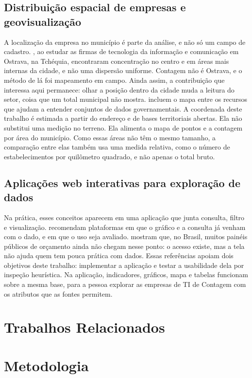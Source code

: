 \subsection{Distribuição espacial de empresas e geovisualização}

A localização da empresa no município é parte da análise, e não só um campo de cadastro.
, ao estudar as firmas de tecnologia da informação e comunicação em Ostrava, na Tchéquia, encontraram concentração no centro e em áreas mais internas da cidade, e não uma dispersão uniforme.
Contagem não é Ostrava, e o método de lá foi mapeamento em campo.
Ainda assim, a contribuição que interessa aqui permanece: olhar a posição dentro da cidade muda a leitura do setor, coisa que um total municipal não mostra.
 incluem o mapa entre os recursos que ajudam a entender conjuntos de dados governamentais.
A coordenada deste trabalho é estimada a partir do endereço e de bases territoriais abertas.
Ela não substitui uma medição no terreno.
Ela alimenta o mapa de pontos e a contagem por área do município.
Como essas áreas não têm o mesmo tamanho, a comparação entre elas também usa uma medida relativa, como o número de estabelecimentos por quilômetro quadrado, e não apenas o total bruto.

\subsection{Aplicações web interativas para exploração de dados}

Na prática, esses conceitos aparecem em uma aplicação que junta consulta, filtro e visualização.
 recomendam plataformas em que o gráfico e a consulta já venham com o dado, e em que o uso seja avaliado.
 mostram que, no Brasil, muitos painéis públicos de orçamento ainda não chegam nesse ponto: o acesso existe, mas a tela não ajuda quem tem pouca prática com dados.
Essas referências apoiam dois objetivos deste trabalho: implementar a aplicação e testar a usabilidade dela por inspeção heurística.
Na aplicação, indicadores, gráficos, mapa e tabelas funcionam sobre a mesma base, para a pessoa explorar as empresas de TI de Contagem com os atributos que as fontes permitem.

\section{Trabalhos Relacionados}

\section{Metodologia}

